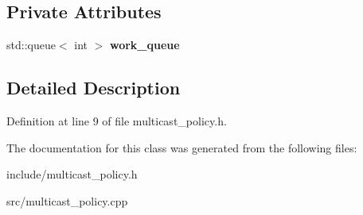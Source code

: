 \subsection*{Private Attributes}
\begin{DoxyCompactItemize}
\item 
std\+::queue$<$ int $>$ {\bfseries work\+\_\+queue}\hypertarget{classdistributed__system_1_1MulticastMutualExclusionPolicy_a3b83f6d4011132a21b274e445d36b740}{}\label{classdistributed__system_1_1MulticastMutualExclusionPolicy_a3b83f6d4011132a21b274e445d36b740}

\end{DoxyCompactItemize}


\subsection{Detailed Description}


Definition at line 9 of file multicast\+\_\+policy.\+h.



The documentation for this class was generated from the following files\+:\begin{DoxyCompactItemize}
\item 
include/multicast\+\_\+policy.\+h\item 
src/multicast\+\_\+policy.\+cpp\end{DoxyCompactItemize}
